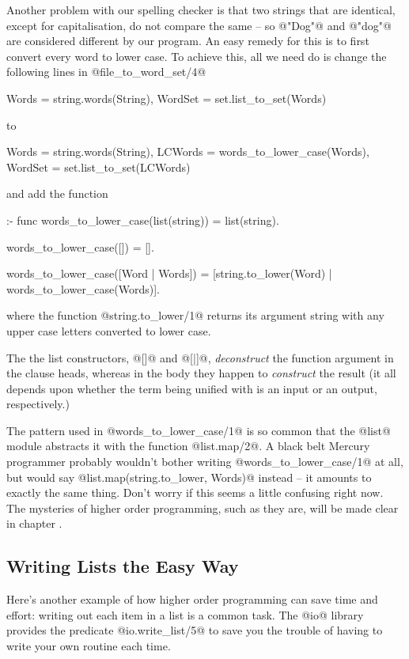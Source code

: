 Another problem with our spelling checker is that two strings that are
identical, except for capitalisation, do not compare the same -- so @"Dog"@
and @"dog"@ are considered different by our program.  An easy remedy for
this is to first convert every word to lower case.  To achieve this, all we
need do is change the following lines in @file_to_word_set/4@
\begin{myverbatim}
    Words   = string.words(String),
    WordSet = set.list_to_set(Words)
\end{myverbatim}
to
\begin{myverbatim}
    Words   = string.words(String),
    LCWords = words_to_lower_case(Words),
    WordSet = set.list_to_set(LCWords)
\end{myverbatim}
and add the function
\begin{myverbatim}
:- func words_to_lower_case(list(string)) = list(string).

words_to_lower_case([]) = [].

words_to_lower_case([Word | Words]) =
    [string.to_lower(Word) | words_to_lower_case(Words)].
\end{myverbatim}
where the function @string.to_lower/1@ returns its argument string with any
upper case letters converted to lower case.

The the list constructors, @[]@ and @[|]@, \emph{deconstruct} the function
argument in the clause heads, whereas in the body they happen to
\emph{construct} the result (it all depends upon whether the term being
unified with is an input or an output, respectively.)

The pattern used in @words_to_lower_case/1@ is so common that the @list@
module abstracts it with the function @list.map/2@.  A black belt Mercury
programmer probably wouldn't bother writing @words_to_lower_case/1@ at all,
but would say @list.map(string.to_lower, Words)@ instead -- it amounts to
exactly the same thing.  Don't worry if this seems a little confusing right
now.  The mysteries of higher order programming, such as they are, will be
made clear in chapter \XXX{}.

\subsection{Writing Lists the Easy Way}

Here's another example of how higher order programming can save time and
effort: writing out each item in a list is a common task.  The @io@ library
provides the predicate @io.write_list/5@ to save you the trouble of having
to write your own routine each time.

